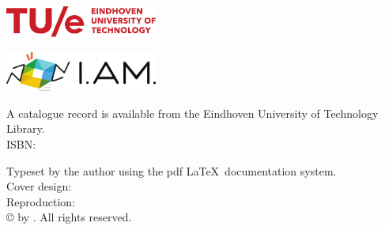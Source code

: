 \thispagestyle{empty}
\vspace*{30mm}\noindent
\begin{center}
{\LARGE\sf\maintitle}\\[4.5cm] %
{\Large\sf \@author}
\end{center}

\newpage
\thispagestyle{empty}






\vspace*{\fill}
\noindent\includegraphics[width=5cm]{img/TUE-logo.pdf}


\vspace{8mm}
\noindent\includegraphics[width=5cm]{img/ProjectLogo.pdf}

\vspace{2mm}
\noindent\bgroup\project
\vspace{8mm}

\noindent\bgroup
A catalogue record is available from the Eindhoven University of Technology Library.\\
ISBN: \isbn

\vspace{4mm}

\noindent Typeset by the author using the pdf \LaTeX \ documentation system.\\
Cover design: \designer \\
Reproduction: \printer\\[8mm]
\copyright\the\year{} by \@author. All rights reserved.
\egroup

\newpage
\thispagestyle{empty}





